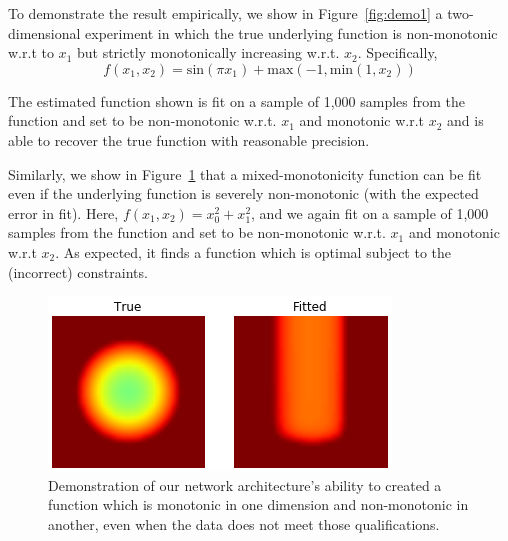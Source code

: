     To demonstrate the result empirically, we show in Figure~\ref{fig:demo1} a two-dimensional experiment in which the true underlying function is non-monotonic w.r.t to $x_1$ but strictly monotonically increasing w.r.t. $x_2$.  Specifically,
    $$ f(x_1, x_2) = \mbox{sin}(\pi x_1) + \mbox{max}(-1, \mbox{min}(1, x_2))  $$
    
    The estimated function shown is fit on a sample of 1,000 samples from the function and set to be non-monotonic w.r.t. $x_1$ and monotonic w.r.t $x_2$ and is able to recover the true function with reasonable precision.
    
    Similarly, we show in Figure~\ref{fig:demo2} that a mixed-monotonicity function can be fit even if the underlying function is severely non-monotonic (with the expected error in fit).  Here, $f(x_1, x_2) = x_0^2 + x_1^2$, and we again fit on a sample of 1,000 samples from the function and set to be non-monotonic w.r.t. $x_1$ and monotonic w.r.t $x_2$.  As expected, it finds a function which is optimal subject to the (incorrect) constraints.
    
    \begin{figure}
        \centering
        \includegraphics[width=.8\textwidth]{fig_monofair/mixed_monotonicity_demo_2.png}
        \caption{Demonstration of our network architecture's ability to created a function which is monotonic in one dimension and non-monotonic in another, even when the data does not meet those qualifications.}
        \label{fig:demo2}
    \end{figure}

